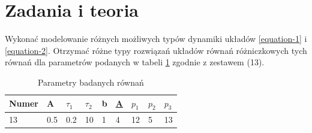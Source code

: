 \documentclass[12pt]{article}
\begin{document}
\leavevmode\thispagestyle{empty}\newpage

\tableofcontents

\newpage

\section{Zadania i teoria}
Wykonać modelowanie różnych możliwych typów dynamiki układów \ref{equation-1} i \ref{equation-2}. Otrzymać różne typy rozwiązań układów równań różniczkowych tych równań dla parametrów podanych w tabeli \ref{table-1} zgodnie z zestawem (13).
\begin{table}[H]
\centering
\begin{tabular}{|l|l|l|l|l|l|l|l|l|}
\hline
Numer & A   & $\tau_1$ & $\tau_2$ & b & {\ul A} & $p_1$ & $p_2$ & $p_3$ \\ \hline
13    & 0.5 & 0.2    & 10     & 1 & 4       & 12  & 5   & 13  \\ \hline
\end{tabular}
\caption{Parametry badanych równań}
\label{table-1}
\end{table}
\end{document}
